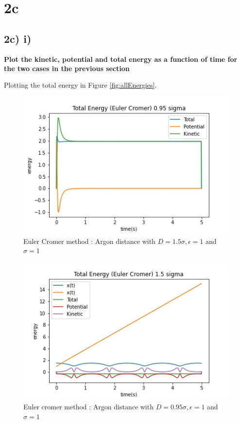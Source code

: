 \newpage
\section*{2c}


\subsection*{2c) i)}
 \textbf{Plot the kinetic, potential and total energy as a function of time for the two cases in the previous
section}

Plotting the total energy in Figure \ref{fig:allEnergies}.

\begin{figure}[h!]
        \centering 
        \includegraphics[scale=0.8]{./py/2ci_allEnergiesCromer15.jpg} 
        \caption{Euler Cromer method : Argon distance with $D = 1.5 \sigma, \epsilon = 1$ and $\sigma = 1$ }
        \label{fig:allEnergiesEuler15}
\end{figure}


\begin{figure}[h!]
        \centering 
        \includegraphics[scale=0.8]{./py/2ci_allEnergiesCromer095.jpg} 
        \caption{Euler cromer method : Argon distance with $D = 0.95 \sigma, \epsilon = 1$ and $\sigma = 1$ }
        \label{fig:allEnergiesEuler95}
\end{figure}


